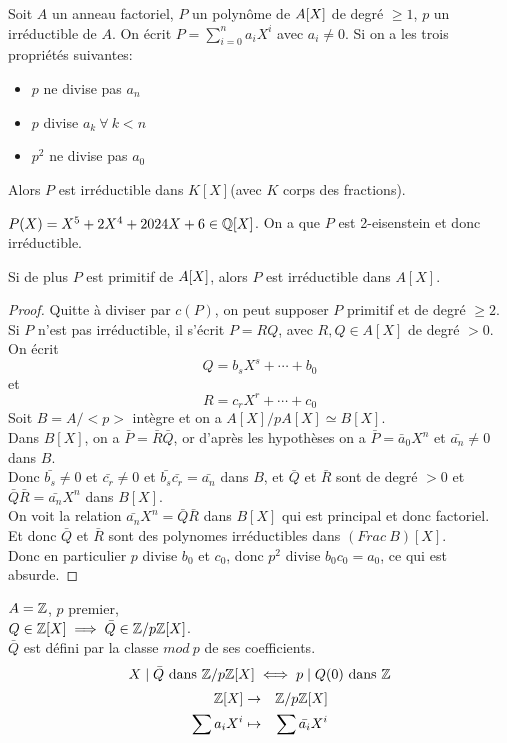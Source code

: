 \begin{theorem}
	Soit $A$ un anneau factoriel, $P$ un polynôme  de $A[X]$ de degré $\geq 1$, $p$ un irréductible de $A$.
	On écrit $P = \sum\limits_{i=0}^n a_iX^i$ avec $a_i \neq 0$. Si on a les trois propriétés suivantes:
	\begin{itemize}
		\item $p$ ne divise pas $a_n$
		\item $p$ divise $a_k \ \forall \ k < n$
		\item $p^2$ ne divise pas $a_0$
	\end{itemize}
	Alors $P$ est irréductible dans $K[X]$(avec $K$ corps des fractions).
\end{theorem}

\begin{example}
	$P(X) = X^5 + 2X^4 + 2024X + 6\in \mathbb{Q}[X]$. On a que $P$ est 2-eisenstein et donc irréductible.
\end{example}

\begin{coro}
	Si de plus $P$ est primitif de $A[X]$, alors $P$ est irréductible dans $A[X]$.
\end{coro}


\begin{proof}
	Quitte à diviser par $c(P)$, on peut supposer $P$ primitif et de degré $\geq 2$.
	Si $P$ n'est pas irréductible, il s'écrit $P=RQ$, avec $R, Q \in A[X]$ de degré $>0$.
	On écrit
	$$Q = b_sX^s + \cdots + b_0$$ et $$R = c_rX^r + \cdots + c_0$$
	Soit $B = A/<p>$ intègre et on a $A[X]/pA[X] \simeq B[X]$. \\
	Dans $B[X]$, on a $\bar{P} = \bar{R}\bar{Q}$,
	or d'après les hypothèses on a $\bar{P} = \bar{a}_0X^n$ et $\bar{a_n} \neq 0 $ dans $B$. \\
	Donc $\bar{b_s} \neq 0$ et $\bar{c_r} \neq 0$ et $\bar{b_s}\bar{c_r} = \bar{a_n}$ dans $B$,
	et $\bar{Q}$ et $\bar{R}$ sont de degré $>0$ et $\bar{Q}\bar{R} = \bar{a_n}X^n$ dans $B[X]$. \\
	On voit la relation $\bar{a_n}X^n= \bar{Q}\bar{R}$ dans $B[X]$ qui est principal et donc factoriel. \\
	Et donc $\bar{Q}$ et $\bar{R}$ sont des polynomes irréductibles dans $(Frac \ B)[X]$.\\
	Donc en particulier $p$ divise $b_0$ et $c_0$, donc $p^2$ divise $b_0c_0 = a_0$, ce qui est absurde.
\end{proof}


\begin{example}
	$A = \mathbb{Z}$, $p$ premier,\\
	$Q \in \mathbb{Z}[X] \implies \bar{Q} \in \mathbb{Z}/p\mathbb{Z}[X]$.\\
	$\bar{Q}$ est défini par la classe $mod\  p$ de ses coefficients.
	$$X \mid \bar{Q} \text{ dans } \mathbb{Z}/p\mathbb{Z}[X] \iff p \mid Q(0) \text{ dans } \mathbb{Z}$$
	\begin{eqnarray*}
		\mathbb{Z}[X] &\to& \mathbb{Z}/p\mathbb{Z}[X] \\
		\sum a_iX^i &\mapsto& \sum \bar{a_i}X^i
	\end{eqnarray*}
\end{example}


